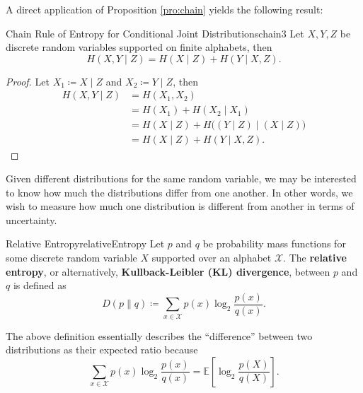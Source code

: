 \documentclass[math]{amznotes}
\theoremstyle{remark}
\begin{document}
A direct application of Proposition \ref{pro:chain} yields the following result:
\begin{corbox}{Chain Rule of Entropy for Conditional Joint Distributions}{chain3}
    Let $X, Y, Z$ be discrete random variables supported on finite alphabets, then 
    \begin{equation*}
        H\left(X, Y \mid Z\right) = H\left(X \mid Z\right) + H\left(Y \mid X, Z\right).
    \end{equation*}
    \tcblower
    \begin{proof}
        Let $X_1 \coloneqq X \mid Z$ and $X_2 \coloneqq Y \mid Z$, then 
        \begin{align*}
            H\left(X, Y \mid Z\right) & = H\left(X_1, X_2\right) \\
            & = H\left(X_1\right) + H\left(X_2 \mid X_1\right) \\
            & = H\left(X \mid Z\right) + H\bigl(\left(Y \mid Z\right) \mid \left(X \mid Z\right)\bigr) \\
            & = H\left(X \mid Z\right) + H\left(Y \mid X, Z\right).
        \end{align*}
    \end{proof}
\end{corbox}
Given different distributions for the same random variable, we may be interested to know how much the distributions differ from one another. In other words, we wish to measure how much one distribution is different from another in terms of uncertainty.
\begin{dfnbox}{Relative Entropy}{relativeEntropy}
    Let $p$ and $q$ be probability mass functions for some discrete random variable $X$ supported over an alphabet $\mathcal{X}$. The {\color{red} \textbf{relative entropy}}, or alternatively, {\color{red} \textbf{Kullback-Leibler (KL) divergence}}, between $p$ and $q$ is defined as 
    \begin{equation*}
        D\left(p \parallel q\right) \coloneqq \sum_{x \in \mathcal{X}}p\left(x\right)\log_2\frac{p\left(x\right)}{q\left(x\right)}.
    \end{equation*}
\end{dfnbox}
The above definition essentially describes the ``difference'' between two distributions as their expected ratio because 
\begin{equation*}
    \sum_{x \in \mathcal{X}}p\left(x\right)\log_2\frac{p\left(x\right)}{q\left(x\right)} = \mathbb{E}\left[\log_2\frac{p(X)}{q(X)}\right].
\end{equation*}
\end{document}
